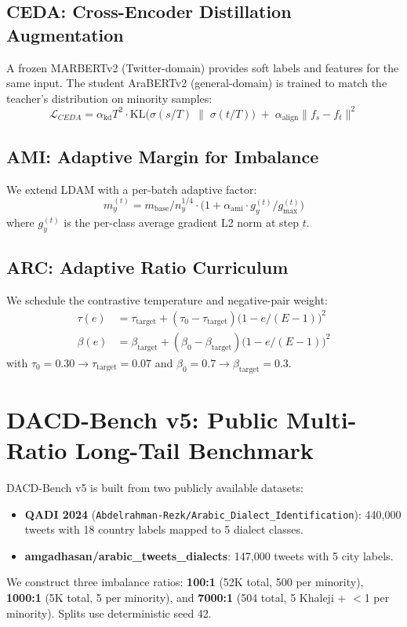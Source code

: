 \documentclass[11pt,a4paper,twocolumn]{article}
\newcommand{\bench}{DACD-Bench}
\newcommand{\ceda}{CEDA}
\newcommand{\ami}{AMI}
\newcommand{\arc}{ARC}
\begin{document}
\subsection{\ceda{}: Cross-Encoder Distillation Augmentation}
A frozen MARBERTv2 (Twitter-domain) provides soft labels and features
for the same input. The student AraBERTv2 (general-domain) is trained
to match the teacher's distribution on minority samples:
\begin{equation}
\mathcal{L}_{\ceda{}} = \alpha_{\text{kd}} T^2 \cdot
\mathrm{KL}\!\bigl(\sigma(s/T)\;\|\;\sigma(t/T)\bigr)
\;+\; \alpha_{\text{align}}\|f_s - f_t\|^2
\label{eq:ceda}
\end{equation}

\subsection{\ami{}: Adaptive Margin for Imbalance}
We extend LDAM with a per-batch adaptive factor:
\begin{equation}
m_y^{(t)} = m_{\text{base}}/n_y^{1/4} \cdot \bigl(1 + \alpha_{\text{ami}} \cdot g_y^{(t)} / g_{\max}^{(t)}\bigr)
\label{eq:ami}
\end{equation}
where $g_y^{(t)}$ is the per-class average gradient L2 norm at
step $t$.

\subsection{\arc{}: Adaptive Ratio Curriculum}
We schedule the contrastive temperature and negative-pair weight:
\begin{align}
\tau(e) &= \tau_{\text{target}} + (\tau_0 - \tau_{\text{target}})\bigl(1 - e/(E{-}1)\bigr)^2 \\
\beta(e) &= \beta_{\text{target}} + (\beta_0 - \beta_{\text{target}})\bigl(1 - e/(E{-}1)\bigr)^2
\label{eq:arc}
\end{align}
with $\tau_0{=}0.30\!\to\!\tau_{\text{target}}{=}0.07$ and
$\beta_0{=}0.7\!\to\!\beta_{\text{target}}{=}0.3$.

\section{\bench{} v5: Public Multi-Ratio Long-Tail Benchmark}
\bench{} v5 is built from two publicly available datasets:
\begin{itemize}\itemsep0pt
\item \textbf{QADI 2024} (\texttt{Abdelrahman-Rezk/Arabic\_Dialect\_Identification}):
440{,}000 tweets with 18 country labels mapped to 5 dialect classes.
\item \textbf{amgadhasan/arabic\_tweets\_dialects}: 147{,}000 tweets
with 5 city labels.
\end{itemize}
We construct three imbalance ratios: \textbf{100:1} (52K total,
500 per minority), \textbf{1000:1} (5K total, 5 per minority), and
\textbf{7000:1} (504 total, 5 Khaleji + $<$1 per minority). Splits
use deterministic seed 42.
\end{document}
